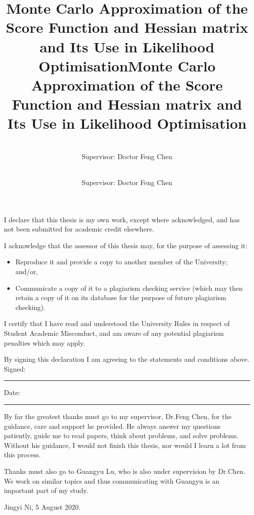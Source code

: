 \documentclass[mstat,12pt]{unswthesis}  %
\title{Monte Carlo Approximation of the Score Function and Hessian matrix and Its Use in Likelihood Optimisation}
\author{\Authornameonly\\{\bigskip}Supervisor: Doctor Feng Chen}\title{Monte Carlo Approximation of the Score Function and Hessian matrix and Its Use in Likelihood Optimisation}
\author{\Authornameonly\\{\bigskip}Supervisor: Doctor Feng Chen}
\newcommand\blankpage{%
    \null
    \thispagestyle{empty}%
    \addtocounter{page}{-1}%
    \newpage}
\numberwithin{equation}{section}
\begin{document}
\beforepreface

\afterpage{\blankpage}



\vskip 10pc \noindent I declare that this thesis is my
own work, except where acknowledged, and has not been submitted for
academic credit elsewhere. 

\vskip 2pc  \noindent I acknowledge that the assessor of this
thesis may, for the purpose of assessing it:
\begin{itemize}
\item Reproduce it and provide a copy to another member of the University; and/or,
\item Communicate a copy of it to a plagiarism checking service (which may then retain a copy of it on its database for the purpose of future plagiarism checking).
\end{itemize}

\vskip 2pc \noindent I certify that I have read and understood the University Rules in
respect of Student Academic Misconduct, and am aware of any potential plagiarism penalties which may 
apply.\vspace{24pt}

\vskip 2pc \noindent By signing 
this declaration I am
agreeing to the statements and conditions above.
\vskip 2pc \noindent
Signed: \rule{7cm}{0.25pt} \hfill Date: \rule{4cm}{0.25pt} \newline
\vskip 1pc

\afterpage{\blankpage}




{\bigskip}By far the greatest thanks must go to my supervisor, Dr.Feng Chen, for
the guidance, care and support he provided. He always answer my questions patiently, guide me to read papers, think about problems, and solve problems. Without his guidance, I would
not finish this thesis, nor would I learn a lot from this process.


{\bigskip\noindent}Thanks 
must also go to Guangyu Lu, who is also under supervision by Dr.Chen. We work on similar topics and thus communicating with Guangyu is an important part of my study.



{\bigskip\bigskip\bigskip\noindent}Jingyi Ni, 5 August 2020.

\afterpage{\blankpage}
\end{document}
